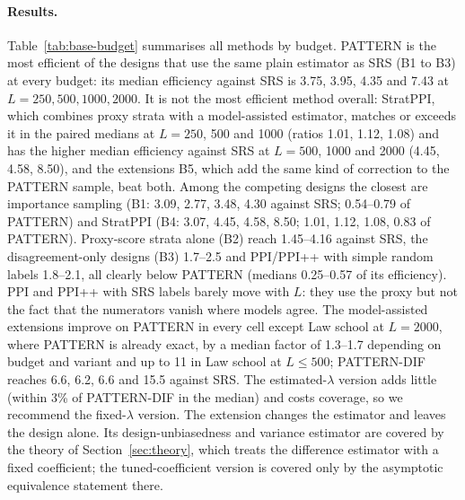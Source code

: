 \documentclass[pdflatex,sn-mathphys-num,iicol]{sn-jnl}
\theoremstyle{thmstyleone}
\theoremstyle{thmstyletwo}
\theoremstyle{thmstylethree}
\begin{document}
\paragraph{Results.} Table~\ref{tab:base-budget} summarises all methods by budget. PATTERN is the most efficient of the designs that use the same plain estimator as SRS (B1 to B3) at every budget: its median efficiency against SRS is 3.75, 3.95, 4.35 and 7.43 at $L=250,500,1000,2000$. It is not the most efficient method overall: StratPPI, which combines proxy strata with a model-assisted estimator, matches or exceeds it in the paired medians at $L=250$, 500 and 1000 (ratios 1.01, 1.12, 1.08) and has the higher median efficiency against SRS at $L=500$, 1000 and 2000 (4.45, 4.58, 8.50), and the extensions B5, which add the same kind of correction to the PATTERN sample, beat both. Among the competing designs the closest are importance sampling (B1: 3.09, 2.77, 3.48, 4.30 against SRS; 0.54--0.79 of PATTERN) and StratPPI (B4: 3.07, 4.45, 4.58, 8.50; 1.01, 1.12, 1.08, 0.83 of PATTERN). Proxy-score strata alone (B2) reach 1.45--4.16 against SRS, the disagreement-only designs (B3) 1.7--2.5 and PPI/PPI++ with simple random labels 1.8--2.1, all clearly below PATTERN (medians 0.25--0.57 of its efficiency). PPI and PPI++ with SRS labels barely move with $L$: they use the proxy but not the fact that the numerators vanish where models agree. The model-assisted extensions improve on PATTERN in every cell except Law school at $L=2000$, where PATTERN is already exact, by a median factor of 1.3--1.7 depending on budget and variant and up to 11 in Law school at $L\le500$; PATTERN-DIF reaches 6.6, 6.2, 6.6 and 15.5 against SRS. The estimated-$\lambda$ version adds little (within 3\% of PATTERN-DIF in the median) and costs coverage, so we recommend the fixed-$\lambda$ version. The extension changes the estimator and leaves the design alone. Its design-unbiasedness and variance estimator are covered by the theory of Section~\ref{sec:theory}, which treats the difference estimator with a fixed coefficient; the tuned-coefficient version is covered only by the asymptotic equivalence statement there.
\end{document}
